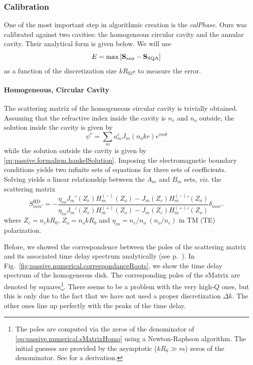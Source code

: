 \subsubsection{Calibration}
One of the most important step in algorithmic creation
is the \textit{\gls{calPhase}}. Ours was calibrated
against two cavities: the homogeneous circular cavity and 
the annular cavity. Their analytical form is given below.
We will use 
  \begin{equation}
   E = \max\left[\mathbf{S}_\text{ana}-\mathbf{S}_\text{SQA}\right] 
  \end{equation}
as a function of the discretization size $kR_02\epsilon$ to measure
the error. 

\paragraph{Homogeneous, Circular Cavity}
The scattering matrix of the homogeneous circular cavity
is trivially obtained. Assuming that the refractive index inside
the cavity is $n_c$ and $n_o$ outside, the solution inside the 
cavity is given by 
  \begin{equation}
   \psi^c = \sum_m a_m^cJ_m(n_okr)e^{im\theta}
  \end{equation}
while the solution outside the cavity is given by \eqref{eq:passive.formalism.hankelSolution}.
Imposing the electromagnetic boundary conditions yields two infinite sets of equations
for three sets of coefficients. Solving yields a linear relationship between the 
$A_m$ and $B_m$ sets, \textit{viz.} the scattering matrix
  \begin{equation}
   \label{eq:passive.numerical.sMatrixHomo}
   S_{mm'}^\text{HD} = -  \frac{\eta_{co}J_m'(Z_c)H_m^{(-)}(Z_o)-J_m(Z_c){H^{(-)}_m}'(Z_o)}
				{\eta_{co}J_m'(Z_c)H_m^{(+)}(Z_o)-J_m(Z_c){H^{(+)}_m}'(Z_o)}\delta_{mm'}.
  \end{equation}
where $Z_c = n_ckR_0$, $Z_o=n_okR_0$ and $\eta_{co}= n_c/n_o\; (n_o/n_c)$ in TM (TE) polarization.

Before, we showed the correspondence between the poles of the scattering matrix and its associated
time delay spectrum analytically (see p.~\pageref{eq:passive.formalism.lorentzianDelays}). 
In Fig.~\ref{fig:passive.numerical.correspondanceRoots}, we show the
time delay spectrum of the homogeneous disk. The corresponding poles of the \gls{sMatrix} are denoted
by squares\footnote{The poles are computed via the zeros of the denominator of \eqref{eq:passive.numerical.sMatrixHomo}
using a Newton-Raphson algorithm. The initial guesses are provided by the asymptotic ($kR_0\gg m$) zeros
of the denominator. See \cite[Annexe A.2.4]{GAG2011} for a derivation.}. There seems to be a problem with the very high-$Q$ ones, but this is only due to the fact
that we have not used a proper discretization $\Delta k$. The other ones line up perfectly with the peaks
of the time delay. 

